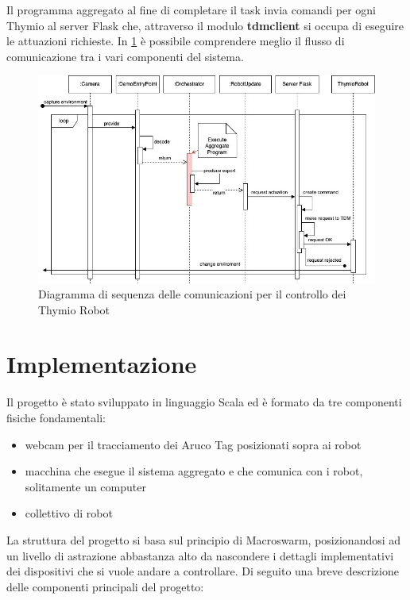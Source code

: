 \documentclass[12pt,a4paper,openright,twoside]{book}
\begin{document}
Il programma aggregato al fine di completare il task invia comandi per ogni Thymio al server Flask che, attraverso il modulo \textbf{tdmclient} si occupa di eseguire le attuazioni richieste. In \cref{fig:sequence} è possibile comprendere meglio il flusso di comunicazione tra i vari componenti del sistema. 

\begin{figure}
    \centering
    \includegraphics[width=.99\linewidth,angle=90]{figures/sequence.jpg}
    \caption{Diagramma di sequenza delle comunicazioni per il controllo dei Thymio Robot}
    \label{fig:sequence}
\end{figure}

\chapter{Implementazione}
\label{chap:implementazione}

Il progetto è stato sviluppato in linguaggio Scala ed è formato da tre componenti fisiche fondamentali:
\begin{itemize}
    \item webcam per il tracciamento dei Aruco Tag posizionati sopra ai robot
    \item macchina che esegue il sistema aggregato e che comunica con i robot, solitamente un computer
    \item collettivo di robot
\end{itemize}

La struttura del progetto si basa sul principio di Macroswarm, posizionandosi ad un livello di astrazione abbastanza alto da nascondere i dettagli implementativi dei dispositivi che si vuole andare a controllare. Di seguito una breve descrizione delle componenti principali del progetto:
\end{document}
